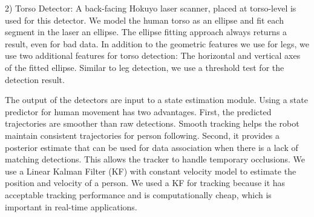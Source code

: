 \documentclass{tADR2e}
\begin{document}
2) Torso Detector: A back-facing Hokuyo laser scanner, placed at torso-level
is used for this detector. We model
the human torso as an ellipse and fit each segment in the laser an ellipse. The ellipse fitting approach always returns a result, even for bad data. In addition to the geometric features we use for legs, we use two additional features for torso detection: The horizontal and vertical axes of the fitted ellipse. Similar to leg detection, we use a threshold test for the detection result.

The output of the detectors are input to a state estimation module. Using a state predictor for human movement has two advantages. First, the predicted trajectories are smoother than
raw detections. Smooth tracking helps the robot maintain consistent trajectories
for person following. Second, it provides a posterior estimate that can be used for data association when there is a lack of
matching detections. This allows the tracker to handle temporary occlusions. We use
a Linear Kalman Filter (KF) with constant velocity model to estimate the position and velocity of a person. We used a KF for tracking because it has acceptable tracking performance and is computationally cheap, which is important in real-time applications.
\end{document}
